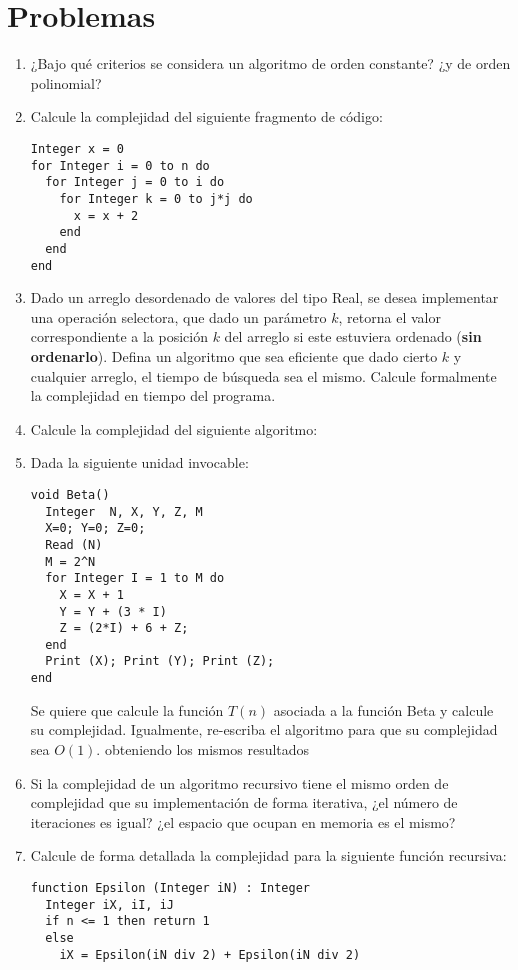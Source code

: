 \section{Problemas}
\begin{enumerate}
\item ¿Bajo qué criterios se considera un algoritmo de orden constante? ¿y de orden polinomial?
\item Calcule la complejidad del siguiente fragmento de código:
\begin{lstlisting}[upquote=true, language=pseudo]
Integer x = 0
for Integer i = 0 to n do
  for Integer j = 0 to i do
    for Integer k = 0 to j*j do
      x = x + 2
    end
  end
end
 \end{lstlisting}
\item Dado un arreglo desordenado de valores del tipo Real, se desea implementar una operación selectora, que dado un parámetro $k$, retorna el valor correspondiente a la posición $k$ del arreglo si este estuviera ordenado (\textbf{sin ordenarlo}). Defina un algoritmo que sea eficiente que dado cierto $k$ y cualquier arreglo, el tiempo de búsqueda sea el mismo. Calcule formalmente la complejidad en tiempo del programa.
\item Calcule la complejidad del siguiente algoritmo:
\item Dada la siguiente unidad invocable:
\begin{lstlisting}[upquote=true, language=pseudo]
void Beta()
  Integer  N, X, Y, Z, M
  X=0; Y=0; Z=0;
  Read (N)
  M = 2^N
  for Integer I = 1 to M do
    X = X + 1
    Y = Y + (3 * I)
    Z = (2*I) + 6 + Z;
  end
  Print (X); Print (Y); Print (Z); 
end
 \end{lstlisting}
 Se quiere que calcule la función $T(n)$ asociada a la función Beta y calcule su complejidad. Igualmente, re-escriba el algoritmo para que su complejidad sea $O(1)$. obteniendo los mismos resultados
 \item Si la complejidad de un algoritmo recursivo tiene el mismo orden de complejidad que su implementación de forma iterativa, ¿el número de iteraciones es igual? ¿el espacio que ocupan en memoria es el mismo?
 \item Calcule de forma detallada la complejidad para la siguiente función recursiva:
\begin{lstlisting}[upquote=true, language=pseudo]
function Epsilon (Integer iN) : Integer
  Integer iX, iI, iJ
  if n <= 1 then return 1
  else
    iX = Epsilon(iN div 2) + Epsilon(iN div 2)

\end{lstlisting}
\end{enumerate}

